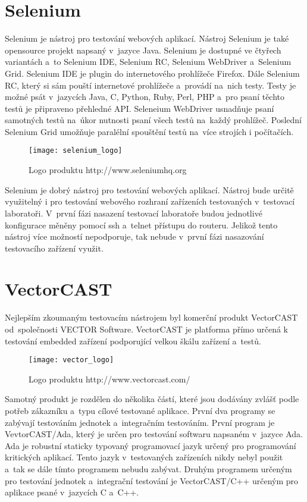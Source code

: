 \section{Selenium}
Selenium je nástroj pro testování webových aplikací. Nástroj Selenium je také opensource projekt napsaný v~jazyce Java. Selenium je dostupné ve čtyřech variantách a~to Selenium IDE, Selenium RC, Selenium WebDriver a~Selenium Grid. Selenium IDE je plugin do internetového prohlížeče Firefox. Dále Selenium RC, který si sám pouští internetové prohlížeče a~provádí na~nich testy. Testy je možné psát v~jazycích Java, C, Python, Ruby, Perl, PHP a~pro psaní těchto testů je připraveno přehledné API. Seleneium WebDriver usnadňuje psaní samotných testů na~úkor nutnosti psaní všech testů na~každý prohlížeč. Poslední Selenium Grid umožňuje paralélní spouštění testů na~více strojích i počítačích.

\begin{figure}[h]
  \centering
  \texttt{[image: selenium\_logo]}
  \caption{Logo produktu http://www.seleniumhq.org}
  \label{fig:selenium_logo}
\end{figure}

Selenium je dobrý nástroj pro testování webových aplikací. Nástroj bude určitě využitelný i pro testování webového rozhraní zařízeních testovaných v~testovací laboratoři. V~první fázi nasazení testovací laboratoře budou jednotlivé konfigurace měněny pomocí ssh a~telnet přístupu do routeru. Jelikož tento nástroj více možností nepodporuje, tak nebude v~první fázi nasazování testovacího zařízení využit.

\section{VectorCAST}
Nejlepším zkoumaným testovacím nástrojem byl komerční produkt VectorCAST od~společnosti VECTOR Software. VectorCAST je platforma přímo určená k testování embedded zařízení podporující velkou škálu zařízení a~testů.

\begin{figure}[h]
  \centering
  \texttt{[image: vector\_logo]}
  \caption{Logo produktu http://www.vectorcast.com/}
  \label{fig:vector_logo}
\end{figure}

Samotný produkt je rozdělen do několika částí, které jsou dodávány zvlášť podle potřeb zákazníku a~typu cílové testované aplikace. První dva programy se zabývají testováním jednotek a~integračním testováním. První program je VevtorCAST/Ada, který je určen pro testování softwaru napsaném v~jazyce Ada. Ada je robustní staticky typovaný programovací jazyk určený pro programování kritických aplikací. Tento jazyk v~testovaných zařízeních nikdy nebyl použit a~tak se dále tímto programem nebudu zabývat. Druhým programem určeným pro testování jednotek a~integrační testování je VectorCAST/C++ určeným pro aplikace psané v~jazycích C a~C++.

